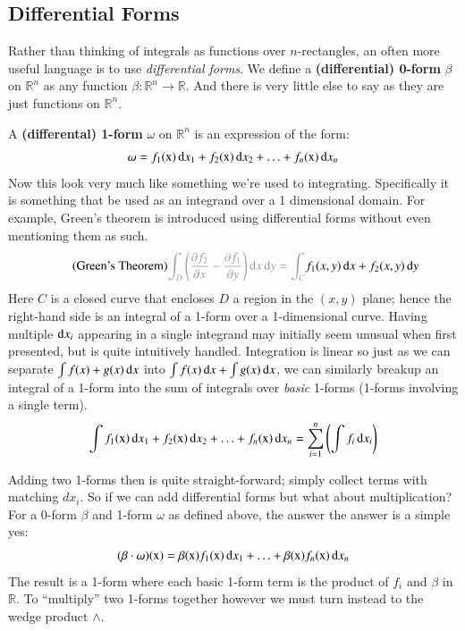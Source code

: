 
\subsection{Differential Forms}

Rather than thinking of integrals as functions over $n$-rectangles, an often more useful language is to use 
\emph{differential forms}.
We define a \textbf{(differential) 0-form} $\beta$ on $\mathbb{R}^n$ as any function 
$\beta : \mathbb{R}^n \to \mathbb{R}$.
And there is very little else to say as they are just functions on $\mathbb{R}^n$.



A \textbf{(differental) 1-form} $\omega$ on $\mathbb{R}^n$ is an expression of the form:
\begin{equation}
	\omega = f_1(\text{x}) \mathop{}\!\mathrm{d} x_1 + f_2(\text{x}) \mathop{}\!\mathrm{d} x_2 + \ldots + f_n(\text{x}) \mathop{}\!\mathrm{d} x_n
\end{equation}
Now this look very much like something we're used to integrating.
Specifically it is something that be used as an integrand over a 1 dimensional domain.
For example, Green's theorem is introduced using differential forms without even mentioning them as such.
\begin{equation}
	\tag{Green's Theorem}
	\textcolor{black!40}{
		\int_D \left( \frac{\partial f_2}{\partial x} - \frac{\partial f_1}{\partial y}  \right) \diff x \diff y 
		=\int_{C}
	} f_1(x,y) \diff x + f_2(x,y) \diff y
\end{equation}
Here $C$ is a closed curve that encloses $D$ a region in the $(x,y)$ plane; hence the right-hand side is an integral of
a 1-form over a 1-dimensional curve.
Having multiple $\mathop{}\!\mathrm{d} x_i$ appearing in a single integrand may initially seem unusual when first presented, 
but is quite intuitively handled.
Integration is linear so just as we can separate $\int f(x) + g(x) \mathop{}\!\mathrm{d} x$ into $\int f(x) \mathop{}\!\mathrm{d} x + \int g(x) \mathop{}\!\mathrm{d} x$, 
we can similarly breakup an integral of a 1-form into the sum of integrals over \emph{basic} 1-forms 
(1-forms involving a single term).
\begin{equation}
	\int f_1(\text{x}) \mathop{}\!\mathrm{d} x_1 
		+ f_2(\text{x}) \mathop{}\!\mathrm{d} x_2 
		+ \ldots 
		+ f_n(\text{x}) \mathop{}\!\mathrm{d} x_n
	=	\sum_{i=1}^n \left( \int f_i \mathop{}\!\mathrm{d} x_i \right)
\end{equation}


Adding two 1-forms then is quite straight-forward; simply collect terms with matching $dx_i$.
So if we can add differential forms but what about multiplication?
For a 0-form $\beta$ and 1-form $\omega$ as defined above, the answer the answer is a simple yes:
\begin{equation}
	(\beta \cdot \omega)(\text{x}) 
		= \beta(\text{x})f_1(\text{x}) \mathop{}\!\mathrm{d} x_1 
		+ \ldots  
		+ \beta(\text{x})f_n(\text{x}) \mathop{}\!\mathrm{d} x_n
\end{equation}
The result is a 1-form where each basic 1-form term is the product of $f_i$ and $\beta$ in $\mathbb{R}$.
To ``multiply'' two 1-forms together however we must turn instead to the wedge product $\wedge$.

